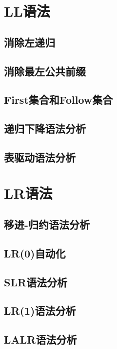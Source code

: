 \documentclass[cn,11pt,chinese]{elegantbook}
\begin{document}
\section{LL语法}

\subsection{消除左递归}

\subsection{消除最左公共前缀}

\subsection{First集合和Follow集合}

\subsection{递归下降语法分析}

\subsection{表驱动语法分析}

\section{LR语法}

\subsection{移进-归约语法分析}

\subsection{LR(0)自动化}

\subsection{SLR语法分析}

\subsection{LR(1)语法分析}

\subsection{LALR语法分析}
\end{document}
